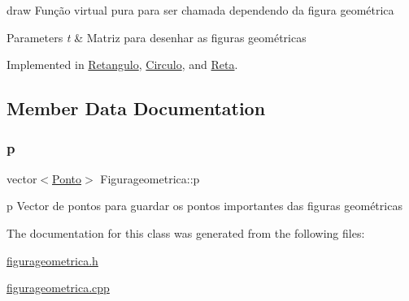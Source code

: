 draw Função virtual pura para ser chamada dependendo da figura geométrica 


\begin{DoxyParams}{Parameters}
{\em t} & Matriz para desenhar as figuras geométricas \\
\hline
\end{DoxyParams}


Implemented in \mbox{\hyperlink{class_retangulo_ac088dd6d3f4f3d3f80363a868c2e74f1}{Retangulo}}, \mbox{\hyperlink{class_circulo_a593787d6e0618c2eded23e8839e7bea6}{Circulo}}, and \mbox{\hyperlink{class_reta_ac2e9805183cd474b62bffd8b032cd780}{Reta}}.



\subsection{Member Data Documentation}
\mbox{\label{class_figurageometrica_a7fe8a9843c286befdf0b96871d6e0a4b}} 
\subsubsection{\texorpdfstring{p}{p}}
{\footnotesize\ttfamily vector$<$\mbox{\hyperlink{class_ponto}{Ponto}}$>$ Figurageometrica\+::p\hspace{0.3cm}{\ttfamily [protected]}}



p Vector de pontos para guardar os pontos importantes das figuras geométricas 



The documentation for this class was generated from the following files\+:\begin{DoxyCompactItemize}
\item 
\mbox{\hyperlink{figurageometrica_8h}{figurageometrica.\+h}}\item 
\mbox{\hyperlink{figurageometrica_8cpp}{figurageometrica.\+cpp}}\end{DoxyCompactItemize}
